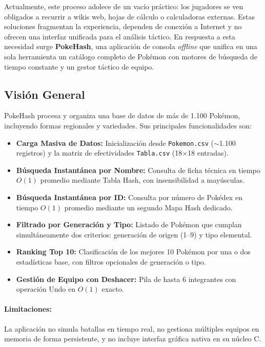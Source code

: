 \documentclass[12pt, letterpaper]{article}
\begin{document}
Actualmente, este proceso adolece de un vacío práctico: los jugadores se ven obligados a recurrir a wikis web, hojas de cálculo o calculadoras externas. Estas soluciones fragmentan la experiencia, dependen de conexión a Internet y no ofrecen una interfaz unificada para el análisis táctico. En respuesta a esta necesidad surge \textbf{PokeHash}, una aplicación de consola \emph{offline} que unifica en una sola herramienta un catálogo completo de Pokémon con motores de búsqueda de tiempo constante y un gestor táctico de equipo.

\subsection{Visión General}

PokeHash procesa y organiza una base de datos de más de 1.100 Pokémon, incluyendo formas regionales y variedades. Sus principales funcionalidades son:

\begin{itemize}
    \item \textbf{Carga Masiva de Datos:} Inicialización desde \texttt{Pokemon.csv} ($\sim$1.100 registros) y la matriz de efectividades \texttt{Tabla.csv} (18$\times$18 entradas).
    \item \textbf{Búsqueda Instantánea por Nombre:} Consulta de ficha técnica en tiempo $O(1)$ promedio mediante Tabla Hash, con insensibilidad a mayúsculas.
    \item \textbf{Búsqueda Instantánea por ID:} Consulta por número de Pokédex en tiempo $O(1)$ promedio mediante un segundo Mapa Hash dedicado.
    \item \textbf{Filtrado por Generación y Tipo:} Listado de Pokémon que cumplan simultáneamente dos criterios: generación de origen (1--9) y tipo elemental.
    \item \textbf{Ranking Top 10:} Clasificación de los mejores 10 Pokémon por una o dos estadísticas base, con filtros opcionales de generación o tipo.
    \item \textbf{Gestión de Equipo con Deshacer:} Pila de hasta 6 integrantes con operación Undo en $O(1)$ exacto.
\end{itemize}

\paragraph{Limitaciones:} La aplicación no simula batallas en tiempo real, no gestiona múltiples equipos en memoria de forma persistente, y no incluye interfaz gráfica nativa en su núcleo C.
\end{document}
